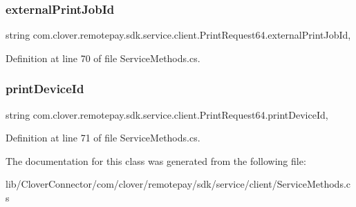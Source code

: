 \subsubsection{\texorpdfstring{external\+Print\+Job\+Id}{externalPrintJobId}}
{\footnotesize\ttfamily string com.\+clover.\+remotepay.\+sdk.\+service.\+client.\+Print\+Request64.\+external\+Print\+Job\+Id\hspace{0.3cm}{\ttfamily [get]}, {\ttfamily [set]}}



Definition at line 70 of file Service\+Methods.\+cs.

\mbox{\label{classcom_1_1clover_1_1remotepay_1_1sdk_1_1service_1_1client_1_1_print_request64_a1f68662859da11bcf6f3e982750dd0d6}} 
\subsubsection{\texorpdfstring{print\+Device\+Id}{printDeviceId}}
{\footnotesize\ttfamily string com.\+clover.\+remotepay.\+sdk.\+service.\+client.\+Print\+Request64.\+print\+Device\+Id\hspace{0.3cm}{\ttfamily [get]}, {\ttfamily [set]}}



Definition at line 71 of file Service\+Methods.\+cs.



The documentation for this class was generated from the following file\+:\begin{DoxyCompactItemize}
\item 
lib/\+Clover\+Connector/com/clover/remotepay/sdk/service/client/Service\+Methods.\+cs\end{DoxyCompactItemize}
